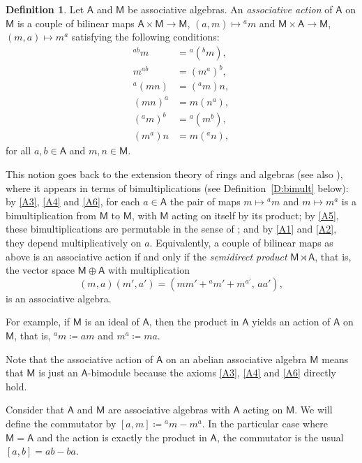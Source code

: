 \documentclass[12pt,reqno]{amsart}
\theoremstyle{plain}
\theoremstyle{definition}
\newtheorem{definition}[theorem]{Definition}
\theoremstyle{remark}
\newcommand{\A}{\ensuremath{\mathsf{A}}}
\newcommand{\MM}{\ensuremath{\mathsf{M}}}
\numberwithin{equation}{section}
\begin{document}
\begin{definition}
Let $\A$ and $\MM$ be associative algebras. An \emph{associative action} of $\A$ on $\MM$ is a couple of bilinear
maps $\A\times \MM\to \MM$, $(a,m)\mapsto {}^am$ and $\MM\times \A\to \MM$, $(m,a)\mapsto m^a$ satisfying the following conditions:
\begin{align}
	 {}^{ab}m &={}^a({}^{b}m), \tag{A1}\label{A1}\\
	m^{ab} & =(m^a)^{b}, \tag{A2}\label{A2}\\
	{}^a (mn) & =({}^a m) n,\tag{A3}\label{A3}\\
	(mn)^a & =m  (n^a), \tag{A4}\label{A4} \\
	({}^a m) ^b & ={}^a(m^{b}), \tag{A5}\label{A5}\\
	(m^a) n & = m ({}^an),\tag{A6}\label{A6}
\end{align}
for all $a,b\in \A$ and $m,n\in \MM$.
\end{definition}
This notion goes back to the extension theory of rings and algebras \cite{Ev,Hoc,Mac} (see also \cite{CDL,LL}), where it appears in terms of bimultiplications (see Definition~\ref{D:bimult} below):
 by \eqref{A3}, \eqref{A4} and \eqref{A6}, for each $a\in\A$ the pair of maps $m\mapsto{}^am$ and $m\mapsto m^a$ is a bimultiplication from $\MM$ to $\MM$, with $\MM$ acting on itself by its product;
  by \eqref{A5}, these bimultiplications are permutable in the sense of \cite{Mac}; and by \eqref{A1} and \eqref{A2}, they depend multiplicatively on $a$. Equivalently,
   a couple of bilinear maps as above is an associative action if and only if the \emph{semidirect product} $\MM\rtimes\A$, that is, the vector space $\MM\oplus\A$ with multiplication
\[
(m,a)(m',a')=(mm'+{}^{a}m'+m^{a'},\,aa'),
\]
is an associative algebra.

For example, if $\MM$ is an  ideal of $\A$, then the product in $\A$ yields an action of $\A$ on $\MM$, that is, ${}^am \coloneqq am$ and $m^a \coloneqq ma$.

Note that the associative action of $\A$ on an abelian associative algebra $\MM$ means that  $\MM$ is just an 
$\A$-bimodule because the axioms \eqref{A3}, \eqref{A4} and \eqref{A6} directly hold.

Consider that $\A$ and $\MM$ are associative algebras with $\A$ acting on $\MM$. We will define the commutator by $ [a,m] \coloneqq {}^a m -m ^a$.
 In the particular case where $\MM=\A$ and the action is exactly the product in $\A$, the commutator is the usual $[a, b]=a b -b a$.
\end{document}
